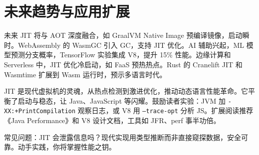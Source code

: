 \chapter{未来趋势与应用扩展}
未来 JIT 将与 AOT 深度融合，如 GraalVM Native Image 预编译镜像，启动瞬时。WebAssembly 的 WasmGC 引入 GC，支持 JIT 优化。AI 辅助兴起，ML 模型预测分支概率，TensorFlow 实验集成 V8，提升 15\%{} 性能。边缘计算和 Serverless 中，JIT 优化冷启动，如 FaaS 预热热点。Rust 的 Cranelift JIT 和 Wasmtime 扩展到 Wasm 运行时，预示多语言时代。\par
JIT 是现代虚拟机的灵魂，从热点检测到激进优化，推动动态语言性能革命。它平衡了启动与稳态，让 Java、JavaScript 等闪耀。鼓励读者实验：JVM 加 \texttt{-XX:+PrintCompilation} 观察日志，或 V8 用 \texttt{--trace-opt} 分析 JS。扩展阅读推荐《Java Performance》和 V8 设计文档，工具如 JFR、perf 事半功倍。\par
常见问题：JIT 会泄露信息吗？现代实现用类型推断而非直接窥探数据，安全可靠。动手实践，你将掌握性能之钥。\par
